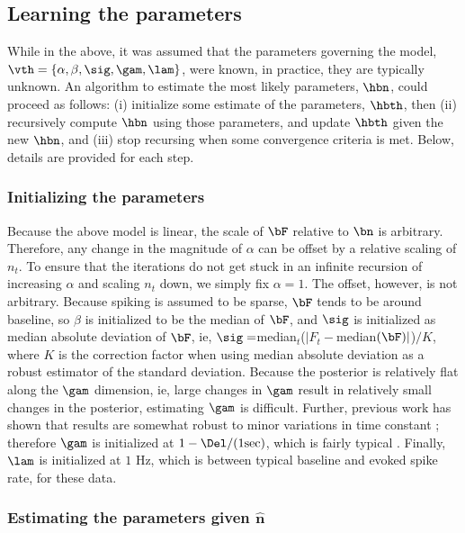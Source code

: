 \subsection{Learning the parameters} \label{sec:learn}

While in the above, it was assumed that the parameters governing the model, $\vth=\{\alpha, \beta, \sig, \gam, \lam\}$, were known, in practice, they are typically unknown. An algorithm to estimate the most likely parameters, $\hbn$, could proceed as follows: (i) initialize some estimate of the parameters, $\hbth$, then (ii) recursively compute $\hbn$ using those parameters, and update $\hbth$ given the new $\hbn$, and (iii) stop recursing when some convergence criteria is met.  Below, details are provided for each step.

\subsubsection{Initializing the parameters} \label{sec:init}

Because the above model is linear, the scale of $\bF$ relative to $\bn$ is arbitrary.  Therefore, any change in the magnitude of $\alpha$ can be offset by a relative scaling of $n_t$.  To ensure that the iterations do not get stuck in an infinite recursion of increasing $\alpha$ and scaling $n_t$ down, we simply fix $\alpha=1$. The offset, however, is not arbitrary.  Because spiking is assumed to be sparse, $\bF$ tends to be around baseline, so $\beta$ is initialized to be the median of $\bF$, and $\sig$ is initialized as median absolute deviation of $\bF$, ie, $\sig=$median$_t$($|F_t-$median$(\bF)|$)$/K$, where $K$ is the correction factor when using median absolute deviation as a robust estimator of the standard deviation.  Because the posterior is relatively flat along the $\gam$ dimension, ie, large changes in $\gam$ result in relatively small changes in the posterior, estimating $\gam$ is difficult.  Further, previous work has shown that results are somewhat robust to minor variations in time constant \cite{YaksiFriedrich06}; therefore $\gam$ is initialized at $1-\Del/(1 \text{sec})$, which is fairly typical \cite{PologrutoSvoboda04}. Finally, $\lam$ is initialized at $1$ Hz, which is between typical baseline and evoked spike rate, for these data.

\subsubsection{Estimating the parameters given $\widehat{\mathbf{n}}$}

